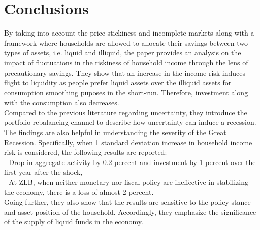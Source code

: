 \documentclass[titlepage]{\econtex}
\begin{document}
\hypertarget{Conclusions}{}
\section{Conclusions}

By taking into account the price stickiness and incomplete markets along with a framework where households are allowed to allocate their savings between two types of assets, i.e. liquid and illiquid, the paper provides an analysis on the impact of fluctuations in the riskiness of household income through the lens of precautionary savings.  They show that an increase in the income risk induces flight to liquidity as people prefer liquid assets over the illiquid assets for consumption smoothing puposes in the short-run. Therefore, investment along with the consumption also decreases.\\
Compared to the previous literature regarding uncertainty, they introduce the portfolio rebalancing channel to describe how uncertainty can induce a recession. The findings are also helpful in understanding the severity of the Great Recession. Specifically, when 1 standard deviation increase in household income risk is considered, the following results are reported:\\
- Drop in aggregate activity by 0.2 percent  and investment by 1 percent over the first year after the shock,\\
- At ZLB, when neither monetary nor fiscal policy are ineffective in stabilizing the economy, there is a loss of almost 2 percent.\\
Going further, they also show that the results are sensitive to the policy stance and asset position of the household. Accordingly, they emphasize the significance of the supply of liquid funds in the economy.
  
\clearpage\vfill\eject

\onlyinsubfile{}
\end{document}
